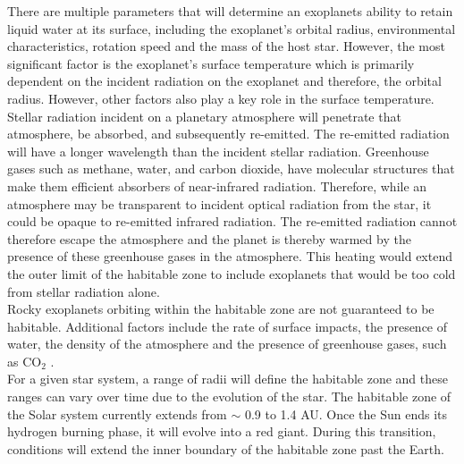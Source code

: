 There are multiple parameters that will determine an exoplanets ability to retain liquid water at its surface, including the exoplanet's orbital radius, environmental characteristics, rotation speed and the mass of the host star. However, the most significant factor is the exoplanet's surface temperature which is primarily dependent on the incident radiation on the exoplanet and therefore, the orbital radius. However, other factors also play a key role in the surface temperature.\\

Stellar radiation incident on a planetary atmosphere will penetrate that atmosphere, be absorbed, and subsequently re-emitted. The re-emitted radiation will have a longer wavelength than the incident stellar radiation. Greenhouse gases such as methane, water, and carbon dioxide, have molecular structures that make them efficient absorbers of near-infrared radiation. Therefore, while an atmosphere may be transparent to incident optical radiation from the star, it could be opaque to re-emitted infrared radiation. The re-emitted radiation cannot therefore escape the atmosphere and the planet is thereby warmed by the presence of these greenhouse gases in the atmosphere. This heating would extend the outer limit of the habitable zone to include exoplanets that would be too cold from stellar radiation alone.\\

Rocky exoplanets orbiting within the habitable zone are not guaranteed to be habitable. Additional factors include the rate of surface impacts, the presence of water, the density of the atmosphere and the presence of greenhouse gases, such as CO$_2$ \citep{2007Selsis}.\\

For a given star system, a range of radii will define the habitable zone and these ranges can vary over time due to the evolution of the star. The habitable zone of the Solar system currently extends from $\sim$ 0.9 to 1.4 AU. Once the Sun ends its hydrogen burning phase, it will evolve into a red giant. During this transition, conditions will extend the inner boundary of the habitable zone past the Earth.\\

